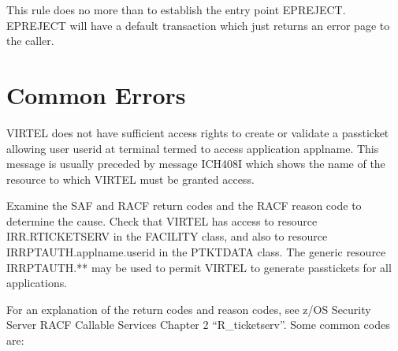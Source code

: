 \documentclass[letterpaper,10pt,english]{sphinxmanual}
\begin{document}
\sphinxAtStartPar
This rule does no more than to establish the entry point EPREJECT. EPREJECT will have a default transaction which just returns an error page to the caller.

\newpage

\ignorespaces 

\section{Common Errors}
\label{\detokenize{connectivity_guide:common-errors}}\label{\detokenize{connectivity_guide:index-167}}
\sphinxAtStartPar
{}

\sphinxAtStartPar
VIRTEL does not have sufficient access rights to create or validate a passticket allowing user userid at terminal termed to access application applname. This message is usually preceded by message ICH408I which shows the name of the resource to which VIRTEL must be granted access.

\sphinxAtStartPar
{}

\sphinxAtStartPar
Examine the SAF and RACF return codes and the RACF reason code to determine the cause. Check that VIRTEL has access to resource IRR.RTICKETSERV in the FACILITY class, and also to resource IRRPTAUTH.applname.userid in the PTKTDATA class. The generic resource IRRPTAUTH.** may be used to permit VIRTEL to generate passtickets for all applications.

\sphinxAtStartPar
For an explanation of the return codes and reason codes, see z/OS Security Server RACF Callable Services Chapter 2 “R\_ticketserv”. Some common codes are:
\end{document}
